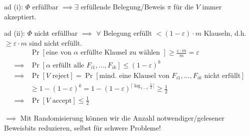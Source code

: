 ad (i):
$\Phi$ erfüllbar $\implies \exists$ erfüllende Belegung/Beweis $\pi$ für die $V$ immer akzeptiert.

ad (ii):
$\Phi$ nicht erfüllbar $\implies$ $\forall$ Belegung erfüllt $< (1-\varepsilon) \cdot m$ Klauseln,
d.h. $\geq \varepsilon \cdot m$ sind nicht erfüllt.
\begin{align*}
    &\Pr [ \text{eine von $\alpha$ erfüllte Klausel zu wählen } ] \geq \frac{\varepsilon \cdot m}{m} = \varepsilon \\
\implies &\Pr [ \alpha \text{ erfüllt alle } F_{i1}, ..., F_{ik} ] \leq (1-\varepsilon)^k \\
\implies &\Pr [ V \text{ reject}]
    = \Pr [ \text{mind. eine Klausel von } F_{i1}, ..., F_{ik} \text{ nicht erfüllt} ] \\
    &\geq 1 - (1-\varepsilon)^k = 1 - (1-\varepsilon)^{ \lceil \log_{1-\varepsilon}\frac{1}{2} \rceil }
    \geq \frac{1}{2} \\
\implies &\Pr [ V \text{ accept} ] \leq \frac{1}{2}
\end{align*}

$\implies$ Mit Randomisierung können wir die Anzahl notwendiger/gelesener Beweisbits reduzieren,
selbst für schwere Probleme!
